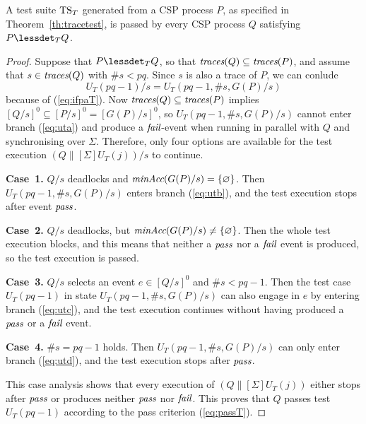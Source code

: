\begin{lemma}\label{lemma:mainfsoundtrace}
A test suite ${\text{TS}}_T$ generated from a CSP process $P$, as specified in
Theorem~\ref{th:tracetest}, is passed by every CSP process $Q$ satisfying
$P\lessdet_T Q$.
\end{lemma}
\begin{proof}
Suppose that $P\lessdet_T Q$, so that $\text{\it traces}(Q)\subseteq\text{\it traces}(P)$, and assume that
$s\in\text{\it traces}(Q)$ with $\#s < pq$. Since $s$ is also a trace of $P$, we can conlude
$$U_T(pq-1)/s = U_T(pq-1,\#s,G(P)/s)$$ because of (\ref{eq:ifpaT}). Now $\text{\it traces}(Q)\subseteq\text{\it traces}(P)$ 
implies $[Q/s]^0\subseteq [P/s]^0 = [G(P)/s]^0$, so $U_T(pq-1,\#s,G(P)/s)$ cannot enter branch (\ref{eq:uta}) and produce a ${\text{\it fail}}$-event when running in parallel with $Q$ and synchronising over $\Sigma$. Therefore, only four options are
available for the test execution    $(Q\parallel[\Sigma] U_T(j))/s$ to continue.

\medskip
\noindent
{\bf Case~1.} $Q/s$ deadlocks and $\text{\it minAcc}(G(P)/s) = \{ \varnothing \}$. Then
$U_T(pq-1,\#s,G(P)/s)$ enters branch (\ref{eq:utb}), and the test execution 
stops after event ${\text{\it pass}}$.


\medskip
\noindent
{\bf Case~2.} $Q/s$ deadlocks, but $\text{\it minAcc}(G(P)/s)\neq\{\varnothing\}$. 
Then the whole test execution blocks, and this   means that
neither a ${\text{\it pass}}$ nor a ${\text{\it fail}}$ event is produced, so the test execution is passed.

\medskip
\noindent
{\bf Case~3.} $Q/s$ selects an event $e\in[Q/s]^0$ and $\#s < pq-1$. Then the test case 
$U_T(pq-1)$ in state
$U_T(pq-1,\#s,G(P)/s)$ can also engage in $e$ by entering branch (\ref{eq:utc}),
and the test execution continues without having produced a ${\text{\it pass}}$ or a ${\text{\it fail}}$ event.

\medskip
\noindent
{\bf Case~4.} $\#s = pq-1$ holds. Then $U_T(pq-1,\#s,G(P)/s)$ can only enter
branch (\ref{eq:utd}), and the test execution stops after ${\text{\it pass}}$.

This case analysis shows that every   execution of $(Q\parallel[\Sigma] U_T(j))$
either stops after ${\text{\it pass}}$ or produces neither ${\text{\it pass}}$ nor ${\text{\it fail}}$. This
proves that $Q$ passes test $U_T(pq-1)$ according to the pass  criterion (\ref{eq:passT}).
\xbox
\end{proof}

